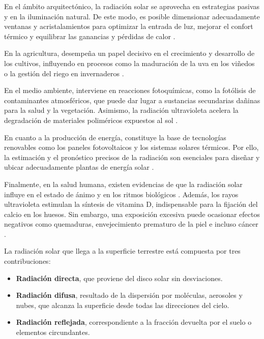En el ámbito arquitectónico, la radiación solar se aprovecha en estrategias pasivas y en la iluminación natural. De este modo, es posible dimensionar adecuadamente ventanas y acristalamientos para optimizar la entrada de luz, mejorar el confort térmico y equilibrar las ganancias y pérdidas de calor \citep{KO2020, GUO2020}.  

En la agricultura, desempeña un papel decisivo en el crecimiento y desarrollo de los cultivos, influyendo en procesos como la maduración de la uva en los viñedos o la gestión del riego en invernaderos \citep{Montero2022, Almanza2011, Espitia2024, COSSU2014}.  

En el medio ambiente, interviene en reacciones fotoquímicas, como la fotólisis de contaminantes atmosféricos, que puede dar lugar a sustancias secundarias dañinas para la salud y la vegetación. Asimismo, la radiación ultravioleta acelera la degradación de materiales poliméricos expuestos al sol \citep{GOMEZ2023, Zhang2022, Bai2024}.  

En cuanto a la producción de energía, constituye la base de tecnologías renovables como los paneles fotovoltaicos y los sistemas solares térmicos. Por ello, la estimación y el pronóstico precisos de la radiación son esenciales para diseñar y ubicar adecuadamente plantas de energía solar \citep{BAMISILE2025, Wiatros2022, SUN2022}.  

Finalmente, en la salud humana, existen evidencias de que la radiación solar influye en el estado de ánimo y en los ritmos biológicos \citep{GARNACHO2020}. Además, los rayos ultravioleta estimulan la síntesis de vitamina D, indispensable para la fijación del calcio en los huesos. Sin embargo, una exposición excesiva puede ocasionar efectos negativos como quemaduras, envejecimiento prematuro de la piel e incluso cáncer \citep{Cestari2017, Neale2019}.  



La radiación solar que llega a la superficie terrestre está compuesta por tres contribuciones:  
\begin{itemize}
    \item \textbf{Radiación directa}, que proviene del disco solar sin desviaciones.  
    \item \textbf{Radiación difusa}, resultado de la dispersión por moléculas, aerosoles y nubes, que alcanza la superficie desde todas las direcciones del cielo.  
    \item \textbf{Radiación reflejada}, correspondiente a la fracción devuelta por el suelo o elementos circundantes.  
\end{itemize}


